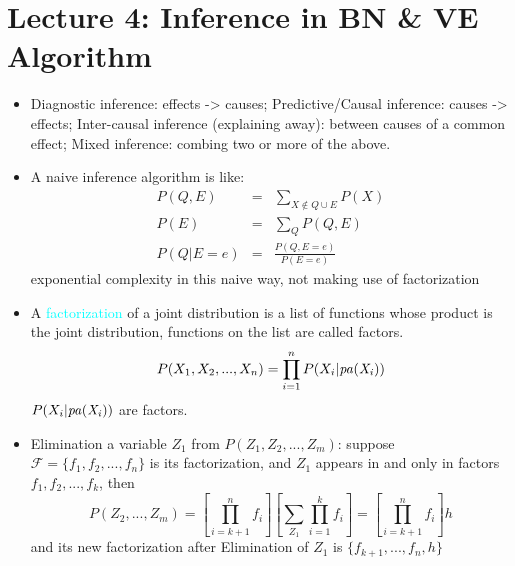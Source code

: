 
\section*{Lecture 4: Inference in BN \& VE Algorithm}

\begin{itemize}
    \item Diagnostic inference: effects -> causes; Predictive/Causal inference: causes -> effects; Inter-causal inference (explaining away): between causes of a common effect; Mixed inference: combing two or more of the above.

    \item A naive inference algorithm is like:
        \begin{eqnarray*}
            P(Q,E) &=& \sum_{X \notin Q \cup E}{P(X)} \\
            P(E) &=& \sum_{Q}{P(Q,E)} \\
            P(Q|E=e) &=& \frac{P(Q,E=e)}{P(E=e)}
        \end{eqnarray*}
   exponential complexity in this naive way, not making use of factorization

   \item A \textcolor{cyan}{factorization} of a joint distribution is a list of functions whose product is the joint distribution, functions on the list are called factors.
       \[ P(X_1, X_2, ..., X_n) = \prod_{i=1}^{n}P(X_i|\it{pa}(X_i))\]
$P(X_i|\it{pa}(X_i))$ are factors.

    \item Elimination a variable $Z_1$ from $P(Z_1,Z_2,...,Z_m)$: suppose $\mathcal{F} = \{f_1, f_2, ..., f_n\}$ is its factorization, and $Z_1$ appears in and only in factors $f_1, f_2, ..., f_k$, then 
        \[ P(Z_2,...,Z_m) = [\prod_{i=k+1}^{n}f_i] [\sum_{Z_1}\prod_{i=1}^{k}f_i] = [\prod_{i=k+1}^{n}f_i]h \]
        and its new factorization after Elimination of $Z_1$ is $\{f_{k+1},...,f_n, h\}$ 


\end{itemize}
